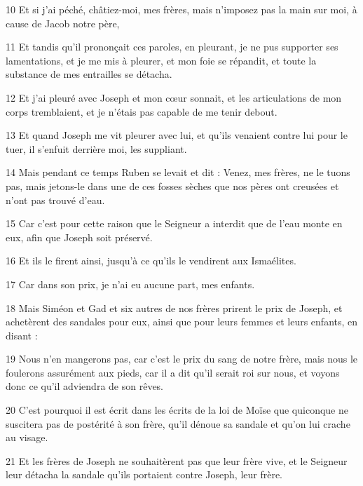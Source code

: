 \par 10 Et si j'ai péché, châtiez-moi, mes frères, mais n'imposez pas la main sur moi, à cause de Jacob notre père,

\par 11 Et tandis qu'il prononçait ces paroles, en pleurant, je ne pus supporter ses lamentations, et je me mis à pleurer, et mon foie se répandit, et toute la substance de mes entrailles se détacha.

\par 12 Et j'ai pleuré avec Joseph et mon cœur sonnait, et les articulations de mon corps tremblaient, et je n'étais pas capable de me tenir debout.

\par 13 Et quand Joseph me vit pleurer avec lui, et qu'ils venaient contre lui pour le tuer, il s'enfuit derrière moi, les suppliant.

\par 14 Mais pendant ce temps Ruben se levait et dit : Venez, mes frères, ne le tuons pas, mais jetons-le dans une de ces fosses sèches que nos pères ont creusées et n'ont pas trouvé d'eau.

\par 15 Car c'est pour cette raison que le Seigneur a interdit que de l'eau monte en eux, afin que Joseph soit préservé.

\par 16 Et ils le firent ainsi, jusqu'à ce qu'ils le vendirent aux Ismaélites.

\par 17 Car dans son prix, je n'ai eu aucune part, mes enfants.

\par 18 Mais Siméon et Gad et six autres de nos frères prirent le prix de Joseph, et achetèrent des sandales pour eux, ainsi que pour leurs femmes et leurs enfants, en disant :

\par 19 Nous n'en mangerons pas, car c'est le prix du sang de notre frère, mais nous le foulerons assurément aux pieds, car il a dit qu'il serait roi sur nous, et voyons donc ce qu'il adviendra de son rêves.

\par 20 C'est pourquoi il est écrit dans les écrits de la loi de Moïse que quiconque ne suscitera pas de postérité à son frère, qu'il dénoue sa sandale et qu'on lui crache au visage.

\par 21 Et les frères de Joseph ne souhaitèrent pas que leur frère vive, et le Seigneur leur détacha la sandale qu'ils portaient contre Joseph, leur frère.

